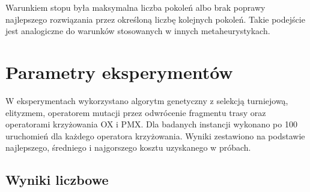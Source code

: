 \documentclass[12pt,a4paper]{article}
\begin{document}
Warunkiem stopu była maksymalna liczba pokoleń albo brak poprawy najlepszego rozwiązania przez określoną liczbę kolejnych pokoleń. Takie podejście jest analogiczne do warunków stosowanych w innych metaheurystykach.

\section{Parametry eksperymentów}

W eksperymentach wykorzystano algorytm genetyczny z selekcją turniejową, elityzmem, operatorem mutacji przez odwrócenie fragmentu trasy oraz operatorami krzyżowania OX i PMX. Dla badanych instancji wykonano po 100 uruchomień dla każdego operatora krzyżowania. Wyniki zestawiono na podstawie najlepszego, średniego i najgorszego kosztu uzyskanego w próbach.

\subsection{Wyniki liczbowe}

\begin{table}[H]
    \centering
    \caption{Wyniki algorytmu genetycznego dla 100 wykonań. Kolumna \% oznacza stosunek najlepszego uzyskanego wyniku do wartości Best Bound.}
\end{table}
\end{document}
